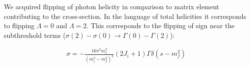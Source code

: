 We acquired flipping of photon helicity in comparison to matrix element contributing to the cross-section. In the language of total helicities it corresponds to flipping $\Lambda=0$ and $\Lambda=2$. This corresponds to the flipping of sign near the subthreshold terms ($\sigma(2) - \sigma(0) \rightarrow \Gamma(0) - \Gamma(2)$):

\begin{align} \label{eq:app:crsc-dw-subthr}
    \sigma = -\frac{16 \pi^2 m_f^3}{(m_i^2 - m_f^2)^2} (2J_i + 1) \Gamma \delta(s - m_f^2)
\end{align}
